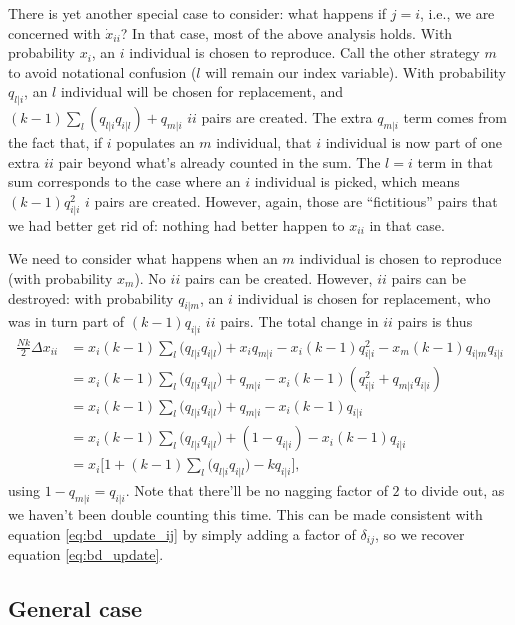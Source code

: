 \documentclass[13pt, justified]{tufte-handout}
\begin{document}
There is yet another special case to consider: what happens if $j = i$, i.e., we are concerned with $\dot{x}_{ii}$?
In that case, most of the above analysis holds.
With probability $x_i$, an $i$ individual is chosen to reproduce.
Call the other strategy $m$ to avoid notational confusion ($l$ will remain our index variable).
With probability $q_{l|i}$, an $l$ individual will be chosen for replacement, and $(k-1)\sum_l (q_{l|i}q_{i|l}) + q_{m|i}$ $ii$ pairs are created.
The extra $q_{m|i}$ term comes from the fact that, if $i$ populates an $m$ individual, that $i$ individual is now part of one extra $ii$ pair beyond what's already counted in the sum.
The $l = i$ term in that sum corresponds to the case where an $i$ individual is picked, which means $(k-1)q_{i|i}^2$ $i$ pairs are created.
However, again, those are ``fictitious'' pairs that we had better get rid of: nothing had better happen to $x_{ii}$ in that case.

We need to consider what happens when an $m$ individual is chosen to reproduce (with probability $x_m$).
No $ii$ pairs can be created.
However, $ii$ pairs can be destroyed: with probability $q_{i|m}$, an $i$ individual is chosen for replacement, who was in turn part of $(k-1)q_{i|i}$ $ii$ pairs.
The total change in $ii$ pairs is thus
\begin{equation}
    \begin{split}
        \frac{Nk}{2} \Delta x_{ii} & = x_i (k-1)\sum_l \Big( q_{l|i}q_{i|l} \Big) + x_i q_{m|i} - x_i(k-1)q_{i|i}^2 - x_m (k-1) q_{i|m}q_{i|i}
        \\
        & = x_i (k-1) \sum_l \Big( q_{l|i}q_{i|l} \Big) + q_{m|i} - x_i (k-1) (q_{i|i}^2 + q_{m|i}q_{i|i})
        \\
        & = x_i (k-1) \sum_l \Big( q_{l|i}q_{i|l} \Big) + q_{m|i} - x_i (k-1)q_{i|i}
        \\
        & = x_i (k-1) \sum_l \Big( q_{l|i}q_{i|l} \Big) + (1 - q_{i|i}) - x_i (k-1)q_{i|i}
        \\
        & = x_i \Big[ 1 + (k-1) \sum_l \Big( q_{l|i}q_{i|l} \Big) - kq_{i|i} \Big],
    \end{split}
\end{equation}
using $1 - q_{m|i} = q_{i|i}$.
Note that there'll be no nagging factor of $2$ to divide out, as we haven't been double counting this time.
This can be made consistent with equation \ref{eq:bd_update_ij} by simply adding a factor of $\delta_{ij}$, so we recover equation \ref{eq:bd_update}.

\subsection{General case}
\end{document}
